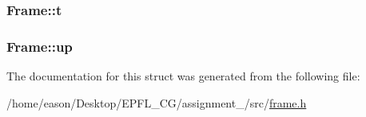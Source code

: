 \subsubsection[{\texorpdfstring{t}{t}}]{ Frame\+::t}\hypertarget{structFrame_a9525a4f9bd5830f785dc9479f961a751}{}\label{structFrame_a9525a4f9bd5830f785dc9479f961a751}
\subsubsection[{\texorpdfstring{up}{up}}]{ Frame\+::up}\hypertarget{structFrame_ad9275ea49c9bc78e7631f3275cbfada2}{}\label{structFrame_ad9275ea49c9bc78e7631f3275cbfada2}


The documentation for this struct was generated from the following file\+:\begin{DoxyCompactItemize}
\item 
/home/eason/\+Desktop/\+E\+P\+F\+L\+\_\+\+C\+G/assignment\+\_/src/\hyperlink{frame_8h}{frame.\+h}\end{DoxyCompactItemize}

